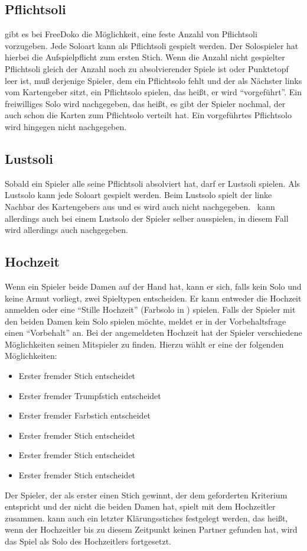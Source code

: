 \documentclass{scrartcl}
\begin{document}
\subsection{Pflichtsoli}
\Optional gibt es bei FreeDoko die Möglichkeit, eine feste Anzahl von Pflichtsoli vorzugeben. Jede Soloart kann als Pflichtsoli gespielt werden. Der Solospieler hat hierbei die Aufspielpflicht zum ersten Stich. Wenn die Anzahl nicht gespielter Pflichtsoli gleich der Anzahl noch zu absolvierender Spiele ist oder Punktetopf leer ist, muß derjenige Spieler, dem ein Pflichtsolo fehlt und der als Nächster links vom Kartengeber sitzt, ein Pflichtsolo spielen, das heißt, er wird "`vorgeführt"'. Ein freiwilliges Solo wird nachgegeben, das heißt, es gibt der Spieler nochmal, der auch schon die Karten zum Pflichtsolo verteilt hat. Ein vorgeführtes Pflichtsolo wird hingegen nicht nachgegeben.

\subsection{Lustsoli}
Sobald ein Spieler alle seine Pflichtsoli absolviert hat, darf er Lustsoli spielen. Als Lustsolo kann jede Soloart gespielt werden.  Beim Lustsolo spielt der linke Nachbar des Kartengebers aus und es wird auch nicht nachgegeben. \Optional \ kann allerdings auch bei einem Lustsolo der Spieler selber ausspielen, in diesem Fall wird allerdings auch nachgegeben.

\subsection{Hochzeit}
Wenn ein Spieler beide \kreuz Damen auf der Hand hat, kann er sich, falls kein Solo und keine Armut vorliegt, zwei Spieltypen entscheiden. Er kann entweder die Hochzeit anmelden oder eine "`Stille Hochzeit"' (Farbsolo in \karo) spielen. Falls der Spieler mit den beiden \kreuz Damen kein Solo spielen möchte, meldet er in der Vorbehaltsfrage einen "`Vorbehalt"' an. Bei der angemeldeten Hochzeit hat der Spieler verschiedene Möglichkeiten seinen Mitspieler zu finden. Hierzu wählt er eine der folgenden Möglichkeiten:
\begin{itemize}
  \item Erster fremder Stich entscheidet
  \item Erster fremder Trumpfstich entscheidet
  \item Erster fremder Farbstich entscheidet
  \item Erster fremder \herz Stich entscheidet
  \item Erster fremder \pik Stich entscheidet
  \item Erster fremder \kreuz Stich entscheidet
\end{itemize}
Der Spieler, der als erster einen Stich gewinnt, der dem geforderten Kriterium entspricht und der nicht die beiden \kreuz Damen hat, spielt mit dem Hochzeitler zusammen. \Optional kann auch ein letzter Klärungsstiches festgelegt werden, das heißt, wenn der Hochzeitler bis zu diesem Zeitpunkt keinen Partner gefunden hat, wird das Spiel als \karo Solo des Hochzeitlers
fortgesetzt.
\end{document}
